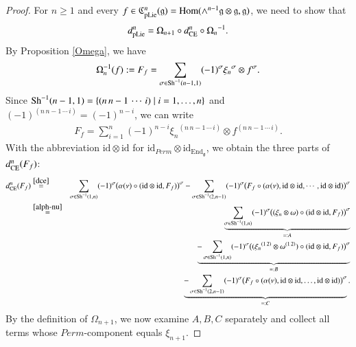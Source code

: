 \documentclass[12pt]{amsart}
\theoremstyle{definition}
\newcommand{\g}{\mathfrak g}
\newcommand{\frkC}{\mathfrak C}
\newcommand{\id}{\mathrm{id}}
\newcommand{\Hom}{\mathrm{Hom}}
\newcommand{\End}{\mathrm{End}}
\newcommand{\ot}{\otimes}
\newcommand{\Sh}{{\rm Sh}}
\newcommand{\pl}{{\rm pLie}}
\begin{document}
\begin{proof}
 For $n\geq 1$ and every $f\in\frkC_{\pl}^n(\g)=\Hom(\wedge^{n-1}\g\otimes\g,\g)$, we need to show that
 $$
 d_{\pl}^n
 =
 \Omega_{n+1}\circ d_{\rm CE}^n\circ{\Omega_n}^{-1}.
 $$
 By Proposition \ref{Omega}, we have
	\begin{align*}
		\Omega^{-1}_n(f):=F_f=\sum_{\sigma\in\Sh^{-1}(n-1,1)} (-1)^\sigma {\xi_n}^\sigma \ot f^\sigma.
	\end{align*}
	Since $\Sh^{-1}(n-1,1)=\{(n\,n-1\,\cdots\,i)\mid i=1,\dots,n\}$ and $(-1)^{(n\,n-1\,\cdots\,i)}=(-1)^{n-i}$, we can write
	\begin{align*}
		F_f=\sum_{i=1}^n (-1)^{n-i} {\xi_n}^{(n\,n-1\,\cdots\,i)} \ot f^{(n\,n-1\,\cdots\,i)}.
	\end{align*}
With the abbreviation $\id\otimes\id$ for $\id_{Perm}\otimes\id_{\End_\g}$, we obtain the three parts of $d_{\rm CE}^n(F_f)$:
	\begin{eqnarray*}
d_{\rm CE}^n(F_f)&\overset{\eqref{dce}}=&\sum_{\sigma\in\Sh^{-1}(1,n)}(-1)^{\sigma}\bigl(\alpha(\nu)\circ(\id\ot\id,F_f)\bigr)^{\sigma}
		-\sum_{\sigma\in\Sh^{-1}(2,n-1)}(-1)^{\sigma}\bigl(F_f\circ(\alpha(\nu),\id\ot\id,\cdots,\id\ot\id)\bigr)^{\sigma}\\
		&\overset{\eqref{alph-nu}}=&\underbrace{\sum_{\sigma\in\Sh^{-1}(1,n)}(-1)^{\sigma}\bigl((\xi_n\otimes\omega)\circ(\id\otimes\id,F_f)\bigr)^{\sigma}}_{=:A}\\
		&&\underbrace{-\sum_{\sigma\in\Sh^{-1}(1,n)}(-1)^{\sigma}\bigl(({\xi_n}^{(1\,2)}\otimes\omega^{(1\,2)})\circ(\id\otimes\id,F_f)\bigr)^{\sigma}}_{=:B}\\
		&&\underbrace{-\sum_{\sigma\in\Sh^{-1}(2,n-1)}(-1)^{\sigma}\bigl(F_f\circ(\alpha(\nu),\id\otimes\id,\dots,\id\otimes\id)\bigr)^{\sigma}}_{=:C}.
	\end{eqnarray*}
By the definition of $\Omega_{n+1}$, we now examine $A,B,C$ separately and collect all terms whose $Perm$-component equals $\xi_{n+1}$.
	

\end{proof}
\end{document}

